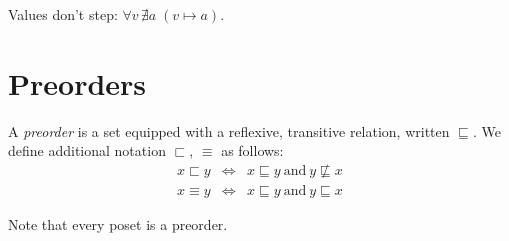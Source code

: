 \documentclass{article}
\renewcommand{\land}{~\text{and}~}
\newcommand{\ale}{\sqsubseteq}
\newcommand{\alt}{\sqsubset}
\newcommand{\aeq}{\equiv}
\newcommand{\step}{\mapsto}
\begin{document}
\begin{theorem}\label{thm:valuesdontstep}
  Values don't step: $\forall v\, \nexists a\; (v \step a)$.
\end{theorem}



\section{Preorders}

\begin{definition}
  A \emph{preorder} is a set equipped with a reflexive, transitive relation,
  written $\ale$. We define additional notation $\alt$, $\aeq$ as follows:
  \begin{eqnarray*}
    x \alt y &\iff& x \ale y \land y \not\ale x\\
    x \aeq y &\iff& x \ale y \land y \ale x
  \end{eqnarray*}

  Note that every poset is a preorder.
\end{definition}




\end{document}
